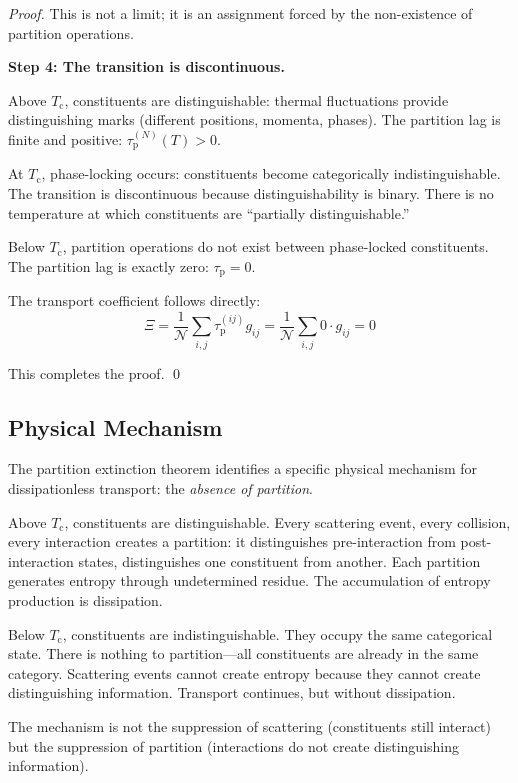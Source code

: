 \documentclass[twocolumn,10pt,aps,prd,superscriptaddress,nofootinbib]{revtex4-2}
\theoremstyle{remark}
\newcommand{\tauP}{\tau_{\mathrm{p}}}
\newcommand{\Tcrit}{T_{\mathrm{c}}}
\newcommand{\Gij}{g_{ij}}
\newcommand{\Norm}{\mathcal{N}}
\newcommand{\Transp}{\Xi}
\begin{document}
\begin{proof}
This is not a limit; it is an assignment forced by the non-existence of partition operations.

\textbf{Step 4: The transition is discontinuous.}

Above $\Tcrit$, constituents are distinguishable: thermal fluctuations provide distinguishing marks (different positions, momenta, phases). The partition lag is finite and positive: $\tauP^{(N)}(T) > 0$.

At $\Tcrit$, phase-locking occurs: constituents become categorically indistinguishable. The transition is discontinuous because distinguishability is binary. There is no temperature at which constituents are ``partially distinguishable.''

Below $\Tcrit$, partition operations do not exist between phase-locked constituents. The partition lag is exactly zero: $\tauP = 0$.

The transport coefficient follows directly:
\begin{equation}
\Transp = \frac{1}{\Norm} \sum_{i,j} \tauP^{(ij)} \Gij = \frac{1}{\Norm} \sum_{i,j} 0 \cdot \Gij = 0
\end{equation}

This completes the proof. \qed
\end{proof}

\subsection{Physical Mechanism}

The partition extinction theorem identifies a specific physical mechanism for dissipationless transport: the \emph{absence of partition}.

Above $\Tcrit$, constituents are distinguishable. Every scattering event, every collision, every interaction creates a partition: it distinguishes pre-interaction from post-interaction states, distinguishes one constituent from another. Each partition generates entropy through undetermined residue. The accumulation of entropy production is dissipation.

Below $\Tcrit$, constituents are indistinguishable. They occupy the same categorical state. There is nothing to partition---all constituents are already in the same category. Scattering events cannot create entropy because they cannot create distinguishing information. Transport continues, but without dissipation.

The mechanism is not the suppression of scattering (constituents still interact) but the suppression of partition (interactions do not create distinguishing information).
\end{document}
